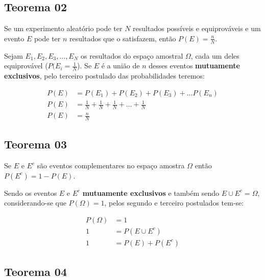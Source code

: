\documentclass[
]{book}
\begin{document}
\hypertarget{teorema-02}{%
\subsection{Teorema 02}\label{teorema-02}}

Se um experimento aleatório pode ter \(N\) resultados possíveis e equiprováveis e um evento \(E\) pode ter \(n\) resultados que o satisfazem, então \(P(E) = \frac{n}{N}\).

\hfill\break

Sejam \(E_{1},E_{2},E_{3},\dots,E_{N}\) os resultados do espaço amostral \(\Omega\), cada um deles equiprovável (\(P(E_{i} =\frac{1}{N}\)). Se \(E\) é a união de \(n\) desses eventos \textbf{mutuamente exclusivos}, pelo terceiro postulado das probabilidades teremos:

\hfill\break

\begin{align*}
P(E) & = P(E_{1}) + P(E_{2}) + P(E_{3}) + ... P(E_{n}) \\
P(E) & = \frac{1}{N} + \frac{1}{N} +\frac{1}{N} +...+\frac{1}{N} \\
P(E) & = \frac{n}{N} 
\end{align*}

\hfill\break

\hypertarget{teorema-03}{%
\subsection{Teorema 03}\label{teorema-03}}

Se \(E\) e \(E^{c}\) são eventos complementares no espaço amostra \(\Omega\) então \(P(E^{c}) = 1 - P(E)\).

\hfill\break

Sendo os eventos \(E\) e \(E^{c}\) \textbf{mutuamente exclusivos} e também sendo \(E \cup E^{c} = \Omega\), considerando-se que \(P(\Omega) = 1\), pelos segundo e terceiro postulados tem-se:

\hfill\break

\begin{align*}
P(\Omega) & = 1 \\
1 & = P(E \cup E^{c}) \\
1 & = P(E) + P(E^{c})
\end{align*}

\hfill\break

\hypertarget{teorema-04}{%
\subsection{Teorema 04}\label{teorema-04}}
\end{document}
